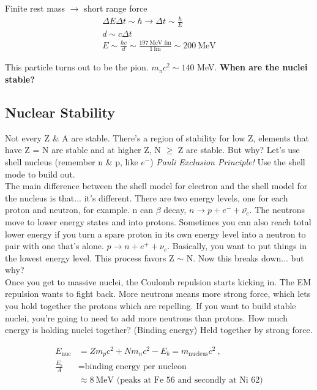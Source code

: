 \documentclass[10pt,letterpaper,final]{book}
\begin{document}
Finite rest mass $\rightarrow$ short range force\\ 

\begin{eqnarray}
\Delta E \Delta t \sim \hbar \rightarrow \Delta t \sim \frac{\hbar}{E}\\
d \sim c \Delta t\\
E \sim \frac{\hbar c}{d} \sim \frac{ 197 ~\text{MeV fm}}{1 ~\text{fm}} \sim 200~ \text{MeV}
\end{eqnarray}

This particle turns out to be the pion. $m_\pi c^2 \sim 140$ MeV. \textbf{When are the nuclei stable? }

\subsection{Nuclear Stability}
Not every Z \& A are stable. There's a region of stability for low Z, elements that have Z = N are stable and at higher Z, N $\geq$ Z are stable. But why? Let's use shell nucleus (remember n \& p, like $e^-$) \textit{Pauli Exclusion Principle!} Use the shell mode to build out. \\

The main difference between the shell model for electron and the shell model for the nucleus is that... it's different. There are two energy levels, one for each proton and neutron, for example. n can $\beta$ decay, $n \rightarrow p + e^- + \bar{\nu_e}$. The neutrons move to lower energy states and into protons. Sometimes you can also reach total lower energy if you turn a spare proton in its own energy level into a neutron to pair with one that's alone. $ p \rightarrow n + e^+ + \nu_e$. Basically, you want to put things in the lowest energy level. This process favors Z $\sim$ N. Now this breaks down... but why? \\
Once you get to massive nuclei, the Coulomb repulsion starts kicking in. The EM repulsion wants to fight back. More neutrons means more strong force, which lets you hold together the protons which are repelling. If you want to build stable nuclei, you're going to need to add more neutrons than protons. How much energy is holding nuclei together? (Binding energy) Held together by strong force. 

\begin{align}
E_\text{nuc} & = Zm_pc^2 + N m_n c^2 -E_b = m_\text{nucleus}c^2~,\\
\frac{E_b}{A} & = \text{binding energy per nucleon}\\
& \approx 8~\text{MeV (peaks at Fe 56 and secondly at Ni 62)}
\end{align}
\end{document}
